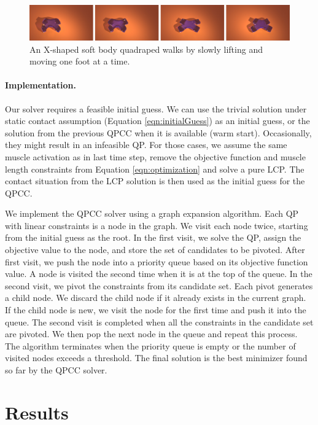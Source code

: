 \begin{figure}[ht]
\centering
\includegraphics[width=\textwidth]{figures/XWalk.eps}
\caption{An X-shaped soft body quadraped walks by slowly lifting and moving one foot at a time.}
\label{fig:XWalk}
\end{figure}

\paragraph{Implementation.}
Our solver requires a feasible initial guess. We can use the trivial solution under static contact assumption (Equation \ref{eqn:initialGuess}) as an initial guess, or the solution from the previous QPCC when it is available (warm start). Occasionally, they might result in an infeasible QP. For those cases, we assume the same muscle activation as in last time step, remove the objective function and muscle length constraints from Equation \ref{eqn:optimization} and solve a pure LCP. The contact situation from the LCP solution is then used as the initial guess for the QPCC.

We implement the QPCC solver using a graph expansion algorithm. Each
QP with linear constraints is a node in the graph. We visit each node
twice, starting from the initial guess as the root. In the first
visit, we solve the QP, assign the objective value to the
node, and store the set of candidates to be pivoted. After first
visit, we push the node into a priority queue based on its objective
function value. A node is visited the second time when it is at the
top of the queue. In the second visit, we pivot the constraints from
its candidate set. Each pivot generates a child node. We discard the
child node if it already exists in the current graph. If the child
node is new, we visit the node for the first time and push it into the
queue. The second visit is completed when all the constraints in the
candidate set are pivoted. We then pop the next node in the queue and
repeat this process. The algorithm terminates when the priority queue
is empty or the number of visited nodes exceeds a threshold. The final
solution is the best minimizer found so far by the QPCC solver.

\section{Results}
\label{sec:results}

